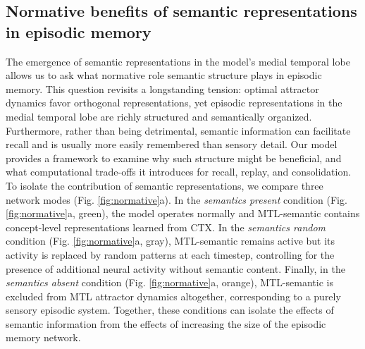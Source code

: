 \documentclass{article}
\begin{document}
\subsection*{Normative benefits of semantic representations in episodic memory}
The emergence of semantic representations in the model’s medial temporal lobe allows us to ask what normative role semantic structure plays in episodic memory. This question revisits a longstanding tension: optimal attractor dynamics favor orthogonal representations, yet episodic representations in the medial temporal lobe are richly structured and semantically organized. Furthermore, rather than being detrimental, semantic information can facilitate recall and is usually more easily remembered than sensory detail. Our model provides a framework to examine why such structure might be beneficial, and what computational trade-offs it introduces for recall, replay, and consolidation.
\newline\newline
To isolate the contribution of semantic representations, we compare three network modes (Fig. \ref{fig:normative}a). In the \textit{semantics present} condition (Fig. \ref{fig:normative}a, green), the model operates normally and MTL-semantic contains concept-level representations learned from CTX. In the \textit{semantics random} condition (Fig. \ref{fig:normative}a, gray), MTL-semantic remains active but its activity is replaced by random patterns at each timestep, controlling for the presence of additional neural activity without semantic content. Finally, in the \textit{semantics absent} condition (Fig. \ref{fig:normative}a, orange), MTL-semantic is excluded from MTL attractor dynamics altogether, corresponding to a purely sensory episodic system. Together, these conditions can isolate the effects of semantic information from the effects of increasing the size of the episodic memory network.
\end{document}
